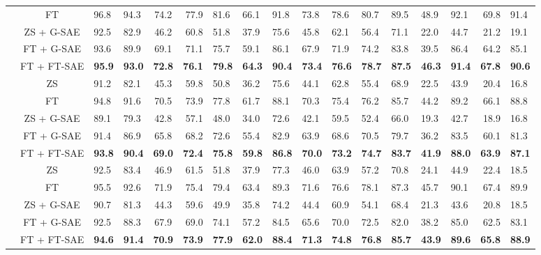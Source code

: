 \begin{table}[!htbp]
{\begin{tabular}{lc A B C D E F G H I J K L M N O}
  & FT               & 96.8 & 94.3 & 74.2 & 77.9 & 81.6 & 66.1 & 91.8 & 73.8 & 78.6 & 80.7 & 89.5 & 48.9 & 92.1 & 69.8 & 91.4 \\
  \cmidrule(l){2-17}
  & ZS + G-SAE       & 92.5 & 82.9 & 46.2 & 60.8 & 51.8 & 37.9 & 75.6 & 45.8 & 62.1 & 56.4 & 71.1 & 22.0 & 44.7 & 21.2 & 19.1 \\
  & FT + G-SAE       & 93.6 & 89.9 & 69.1 & 71.1 & 75.7 & 59.1 & 86.1 & 67.9 & 71.9 & 74.2 & 83.8 & 39.5 & 86.4 & 64.2 & 85.1 \\
  & FT + FT-SAE      & \bf95.9 & \bf93.0 & \bf72.8 & \bf76.1 & \bf79.8 & \bf64.3 & \bf90.4 & \bf73.4 & \bf76.6 & \bf78.7 & \bf87.5 & \bf46.3 & \bf91.4 & \bf67.8 & \bf90.6 \\
\midrule
{}
  & ZS               & 91.2 & 82.1 & 45.3 & 59.8 & 50.8 & 36.2 & 75.6 & 44.1 & 62.8 & 55.4 & 68.9 & 22.5 & 43.9 & 20.4 & 16.8 \\
  & FT               & 94.8 & 91.6 & 70.5 & 73.9 & 77.8 & 61.7 & 88.1 & 70.3 & 75.4 & 76.2 & 85.7 & 44.2 & 89.2 & 66.1 & 88.8 \\
  \cmidrule(l){2-17}
  & ZS + G-SAE       & 89.1 & 79.3 & 42.8 & 57.1 & 48.0 & 34.0 & 72.6 & 42.1 & 59.5 & 52.4 & 66.0 & 19.3 & 42.7 & 18.9 & 16.8 \\
  & FT + G-SAE       & 91.4 & 86.9 & 65.8 & 68.2 & 72.6 & 55.4 & 82.9 & 63.9 & 68.6 & 70.5 & 79.7 & 36.2 & 83.5 & 60.1 & 81.3 \\
  & FT + FT-SAE      & \bf93.8 & \bf90.4 & \bf69.0 & \bf72.4 & \bf75.8 & \bf59.8 & \bf86.8 & \bf70.0 & \bf73.2 & \bf74.7 & \bf83.7 & \bf41.9 & \bf88.0 & \bf63.9 & \bf87.1 \\
\midrule
{}
  & ZS               & 92.5 & 83.4 & 46.9 & 61.5 & 51.8 & 37.9 & 77.3 & 46.0 & 63.9 & 57.2 & 70.8 & 24.1 & 44.9 & 22.4 & 18.5 \\
  & FT               & 95.5 & 92.6 & 71.9 & 75.4 & 79.4 & 63.4 & 89.3 & 71.6 & 76.6 & 78.1 & 87.3 & 45.7 & 90.1 & 67.4 & 89.9 \\
  \cmidrule(l){2-17}
  & ZS + G-SAE       & 90.7 & 81.3 & 44.3 & 59.6 & 49.9 & 35.8 & 74.2 & 44.4 & 60.9 & 54.1 & 68.4 & 21.3 & 43.6 & 20.8 & 18.5 \\
  & FT + G-SAE       & 92.5 & 88.3 & 67.9 & 69.0 & 74.1 & 57.2 & 84.5 & 65.6 & 70.0 & 72.5 & 82.0 & 38.2 & 85.0 & 62.5 & 83.1 \\
  & FT + FT-SAE      & \bf94.6 & \bf91.4 & \bf70.9 & \bf73.9 & \bf77.9 & \bf62.0 & \bf88.4 & \bf71.3 & \bf74.8 & \bf76.8 & \bf85.7 & \bf43.9 & \bf89.6 & \bf65.8 & \bf88.9 \\
\bottomrule
\end{tabular}%
}
\end{table}
 